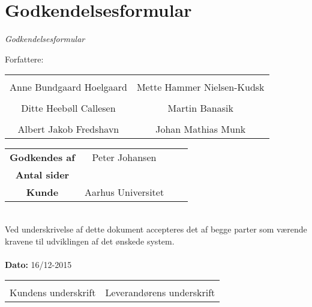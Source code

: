 \chapter{Godkendelsesformular}

{\LARGE\textit{Godkendelsesformular}}

{\large Forfattere:}
\\[5ex]


\begin{tabular}{c c}
\centering 
	\makebox[2.0in]{\hrulefill} & \makebox[2.0in]{\hrulefill}\\
	Anne Bundgaard Hoelgaard & Mette Hammer Nielsen-Kudsk\\[7ex]
	\makebox[2.0in]{\hrulefill} & \makebox[2.0in]{\hrulefill}\\
	Ditte Heebøll Callesen & Martin Banasik\\[7ex]
	\makebox[2.0in]{\hrulefill} & \makebox[2.0in]{\hrulefill}\\
	Albert Jakob Fredshavn & Johan Mathias Munk\\[7ex]
	

\end{tabular}

\begin{tabular}{c c c c}
	\textbf{Godkendes af} & Peter Johansen\\[3ex]
	\textbf{Antal sider} & \pageref{LastPage} \\[3ex]
	\textbf{Kunde} & Aarhus Universitet
\end{tabular}\\[8ex]
Ved underskrivelse af dette dokument accepteres det af begge parter som værende kravene til udviklingen af det ønskede system.
\\
\\
\textbf{Dato: } 16/12-2015\\[7ex]

\begin{tabular}{c c}
	\makebox[2.0in]{\hrulefill} & \makebox[2.0in]{\hrulefill}\\
	\centering 
	Kundens underskrift & Leverandørens underskrift
\end{tabular}
